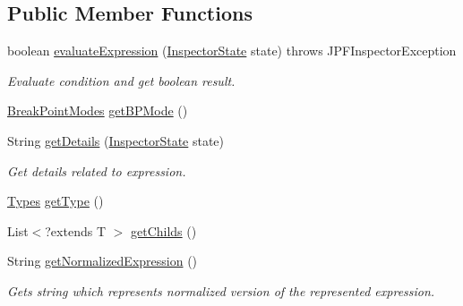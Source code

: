 \subsection*{Public Member Functions}
\begin{DoxyCompactItemize}
\item 
boolean \hyperlink{interfacegov_1_1nasa_1_1jpf_1_1inspector_1_1server_1_1expression_1_1_expression_boolean_interface_adc81f58d2517d5ccb9ace7f5d8b8211f}{evaluate\+Expression} (\hyperlink{interfacegov_1_1nasa_1_1jpf_1_1inspector_1_1server_1_1expression_1_1_inspector_state}{Inspector\+State} state)  throws J\+P\+F\+Inspector\+Exception
\begin{DoxyCompactList}\small\item\em Evaluate condition and get boolean result. \end{DoxyCompactList}\item 
\hyperlink{enumgov_1_1nasa_1_1jpf_1_1inspector_1_1server_1_1breakpoints_1_1_break_point_modes}{Break\+Point\+Modes} \hyperlink{interfacegov_1_1nasa_1_1jpf_1_1inspector_1_1server_1_1expression_1_1_expression_boolean_interface_a970737c885b2bb8abfbd5729275855ac}{get\+B\+P\+Mode} ()
\item 
String \hyperlink{interfacegov_1_1nasa_1_1jpf_1_1inspector_1_1server_1_1expression_1_1_expression_boolean_interface_a6e5af96b023d71fcda296c10f5d7c555}{get\+Details} (\hyperlink{interfacegov_1_1nasa_1_1jpf_1_1inspector_1_1server_1_1expression_1_1_inspector_state}{Inspector\+State} state)
\begin{DoxyCompactList}\small\item\em Get details related to expression. \end{DoxyCompactList}\item 
\hyperlink{enumgov_1_1nasa_1_1jpf_1_1inspector_1_1server_1_1expression_1_1_types}{Types} \hyperlink{interfacegov_1_1nasa_1_1jpf_1_1inspector_1_1server_1_1expression_1_1_expression_node_interface_a5799ecbb793f24840fa3e2eaedc799aa}{get\+Type} ()
\item 
List$<$?extends T $>$ \hyperlink{interfacegov_1_1nasa_1_1jpf_1_1inspector_1_1server_1_1expression_1_1_expression_node_interface_aaeec5305da52fbad211a7abf22b0a854}{get\+Childs} ()
\item 
String \hyperlink{interfacegov_1_1nasa_1_1jpf_1_1inspector_1_1server_1_1expression_1_1_expression_node_interface_ae5387d8da0126c1256a786d54b9bd7ce}{get\+Normalized\+Expression} ()
\begin{DoxyCompactList}\small\item\em Gets string which represents normalized version of the represented expression. \end{DoxyCompactList}\end{DoxyCompactItemize}


